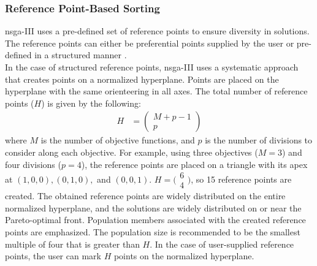 \subsubsection{Reference Point-Based Sorting}
\Gls{nsga}-III uses a pre-defined set of reference points to ensure diversity in solutions. The reference points can either be preferential points supplied by the user or pre-defined in a structured manner \parencite{Deb2013AnConstraints}. \\ 
In the case of structured reference points, \gls{nsga}-III uses a systematic approach that creates points on a normalized hyperplane. Points are placed on the hyperplane with the same orienteering in all axes. The total number of reference points ($H$) is given by the following:
\begin{align*}
    H &= \begin{pmatrix}
    M + p - 1 \\
    p
    \end{pmatrix}
\end{align*}
where $M$ is the number of objective functions, and $p$ is the number of divisions to consider along each objective. For example, using three objectives ($M = 3$) and four divisions ($p = 4$), the reference points are placed on a triangle with its apex at $(1,0,0), (0,1,0),$ and $(0,0,1)$. $H = \big(\begin{smallmatrix}
  6\\
  4
\end{smallmatrix}\big)$, so 15 reference points are created. The obtained reference points are widely distributed on the entire normalized hyperplane, and the solutions are widely distributed on or near the Pareto-optimal front. Population members associated with the created reference points are emphasized. The population size is recommended to be the smallest multiple of four that is greater than $H$. In the case of user-supplied reference points, the user can mark $H$ points on the normalized hyperplane.

